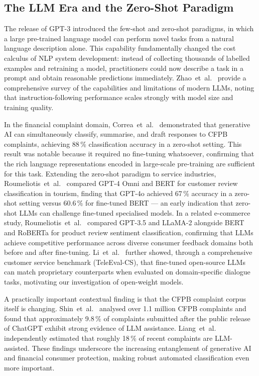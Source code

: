 \documentclass[a4paper,fleqn]{cas-dc}
\begin{document}
\subsection{The LLM Era and the Zero-Shot Paradigm}

The release of GPT-3 \cite{brown2020gpt3} introduced the few-shot and
zero-shot paradigms, in which a large pre-trained language model can
perform novel tasks from a natural language description alone. This
capability fundamentally changed the cost calculus of NLP system
development: instead of collecting thousands of labelled examples and
retraining a model, practitioners could now describe a task in a
prompt and obtain reasonable predictions immediately. Zhao~et~al.\
\cite{zhao2023survey} provide a comprehensive survey of the capabilities
and limitations of modern LLMs, noting that instruction-following
performance scales strongly with model size and training quality.

In the financial complaint domain, Correa~et~al.\ \cite{correa2024genai}
demonstrated that generative AI can simultaneously classify, summarise,
and draft responses to CFPB complaints, achieving 88\,\% classification
accuracy in a zero-shot setting. This result was notable because it
required no fine-tuning whatsoever, confirming that the rich language
representations encoded in large-scale pre-training are sufficient for
this task. Extending the zero-shot paradigm to service industries,
Roumeliotis~et~al.\ \cite{roumeliotis2024tourism} compared GPT-4 Omni
and BERT for customer review classification in tourism, finding that
GPT-4o achieved 67\,\% accuracy in a zero-shot setting versus 60.6\,\%
for fine-tuned BERT --- an early indication that zero-shot LLMs can
challenge fine-tuned specialised models.
In a related e-commerce study, Roumeliotis~et~al.\ \cite{roumeliotis2024ecommerce}
compared GPT-3.5 and LLaMA-2 alongside BERT and RoBERTa for product review
sentiment classification, confirming that LLMs achieve competitive performance
across diverse consumer feedback domains both before and after fine-tuning.
Li~et~al.\
\cite{li2024customerservice} further showed, through a comprehensive
customer service benchmark (TeleEval-CS), that fine-tuned open-source
LLMs can match proprietary counterparts when evaluated on
domain-specific dialogue tasks, motivating our investigation of
open-weight models.

A practically important contextual finding is that the CFPB complaint
corpus itself is changing. Shin~et~al.\ \cite{shin2025llmwritten}
analysed over 1.1 million CFPB complaints and found that approximately
9.8\,\% of complaints submitted after the public release of ChatGPT
exhibit strong evidence of LLM assistance. Liang~et~al.\
\cite{liang2025cfpb} independently estimated that roughly 18\,\% of
recent complaints are LLM-assisted. These findings underscore the
increasing entanglement of generative AI and financial consumer
protection, making robust automated classification even more important.
\end{document}
